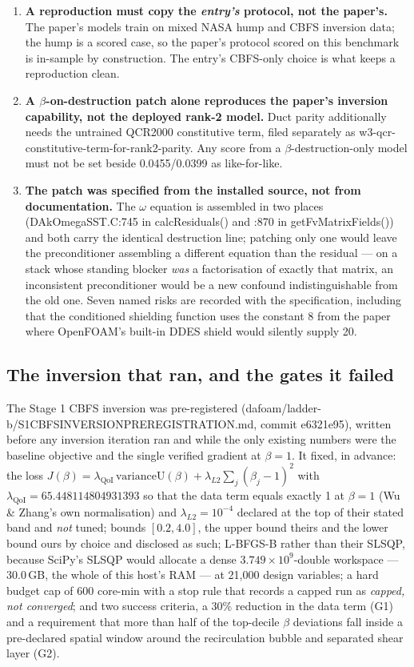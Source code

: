 \documentclass[11pt,a4paper]{article}
\newcommand{\breakus}{\textunderscore\allowbreak}
\newcommand{\code}[1]{{\small\ttfamily\let\_\breakus #1}}
\newcommand{\artifact}[1]{{\footnotesize\ttfamily\let\_\breakus #1}}
\begin{document}
\begin{enumerate}
\item \textbf{A reproduction must copy the \emph{entry's} protocol, not the paper's.} The
  paper's models train on mixed NASA hump and CBFS inversion data; the hump is a scored
  case, so the paper's protocol scored on this benchmark is in-sample by construction. The
  entry's CBFS-only choice is what keeps a reproduction clean.
\item \textbf{A $\beta$-on-destruction patch alone reproduces the paper's inversion
  capability, not the deployed rank-2 model.} Duct parity additionally needs the untrained
  QCR2000 constitutive term, filed separately as
  \code{w3-qcr-constitutive-term-for-rank2-parity}. Any score from a
  $\beta$-destruction-only model must not be set beside 0.0455/0.0399 as like-for-like.
\item \textbf{The patch was specified from the installed source, not from documentation.}
  The $\omega$ equation is assembled in two places (\code{DAkOmegaSST.C:745} in
  \code{calcResiduals()} and \code{:870} in \code{getFvMatrixFields()}) and both carry the
  identical destruction line; patching only one would leave the preconditioner assembling a
  different equation than the residual --- on a stack whose standing blocker \emph{was} a
  factorisation of exactly that matrix, an inconsistent preconditioner would be a new
  confound indistinguishable from the old one. Seven named risks are recorded with the
  specification, including that the conditioned shielding function uses the constant 8 from
  the paper where OpenFOAM's built-in DDES shield would silently supply 20.
\end{enumerate}

\subsection{The inversion that ran, and the gates it failed}
\label{sec:s1result}

The Stage 1 CBFS inversion was pre-registered
(\artifact{dafoam/ladder-b/S1\_CBFS\_INVERSION\_PREREGISTRATION.md},
commit \code{e6321e95}), written before any inversion iteration ran and while the only
existing numbers were the baseline objective and the single verified gradient at $\beta = 1$.
It fixed, in advance: the loss
$J(\beta) = \lambda_{\mathrm{QoI}}\,\mathrm{varianceU}(\beta) + \lambda_{L2}\sum_j(\beta_j-1)^2$
with $\lambda_{\mathrm{QoI}} = 65.448114804931393$ so that the data term equals exactly 1 at
$\beta = 1$ (Wu \& Zhang's own normalisation) and $\lambda_{L2} = 10^{-4}$ declared at the
top of their stated band and \emph{not} tuned; bounds $[0.2, 4.0]$, the upper bound theirs
and the lower bound ours by choice and disclosed as such; L-BFGS-B rather than their SLSQP,
because SciPy's SLSQP would allocate a dense $3.749\times10^9$-double workspace --- 30.0\,GB,
the whole of this host's RAM --- at 21{,}000 design variables; a hard budget cap of 600
core-min with a stop rule that records a capped run as \emph{capped, not converged}; and two
success criteria, a 30\% reduction in the data term (G1) and a requirement that more than
half of the top-decile $\beta$ deviations fall inside a pre-declared spatial window around
the recirculation bubble and separated shear layer (G2).
\end{document}
